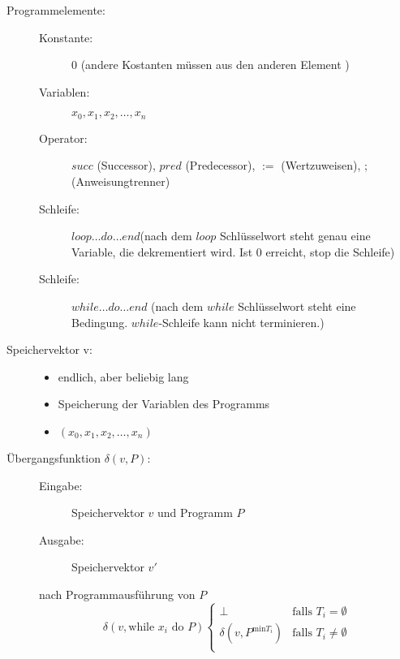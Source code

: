 \documentclass{lehramt-informatik-haupt}
\begin{document}
\begin{description}
\item[Programmelemente:] \strut

\begin{description}
\item[Konstante:]
$0$ (andere Kostanten müssen aus den anderen Element )

\item[Variablen:]
$x_0, x_1, x_2, \dots, x_n$

\item[Operator:]

$succ$ (Successor), $pred$ (Predecessor), $:=$ (Wertzuweisen), $;$ (Anweisungtrenner)

\item[Schleife:]

 $loop \dots do \dots end$(nach dem $loop$ Schlüsselwort steht genau eine
Variable, die dekrementiert wird. Ist 0 erreicht, stop die Schleife)

\item[Schleife:]

$while \dots do \dots end$
(nach dem $while$ Schlüsselwort steht eine Bedingung. $while$-Schleife
kann nicht terminieren.)
\end{description}

\item[Speichervektor v:] \strut

\begin{itemize}
\item endlich, aber beliebig lang
\item Speicherung der Variablen des Programms
\item $(x_0, x_1, x_2, \dots, x_n)$
 \end{itemize}

\item[Übergangsfunktion $\delta(v, P)$:] \strut

\begin{description}
\item[Eingabe:] Speichervektor $v$ und Programm $P$
\item[Ausgabe:] Speichervektor $v'$
\end{description}

nach Programmausführung von $P$
\begin{equation*}
\delta(v, \text{while }x_i\text{ do }P)
\begin{cases}
\bot & \text{falls }T_i = \emptyset\\
\delta(v, P^{\text{min}T_i}) & \text{falls }T_i \neq \emptyset\\
\end{cases}
\end{equation*}
\end{description}
\end{document}
